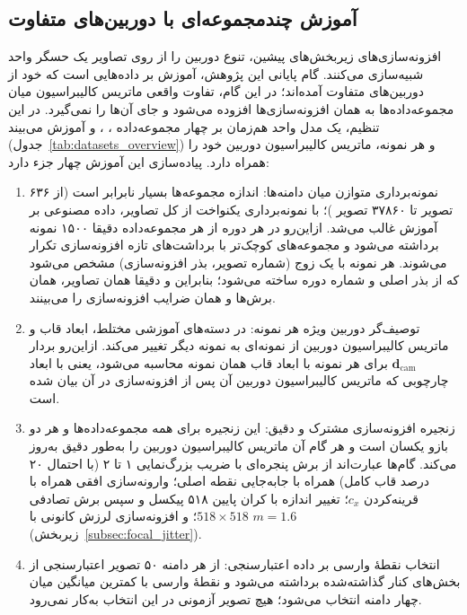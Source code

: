 \subsection[آموزش چندمجموعه‌ای با دوربین‌های متفاوت]{آموزش چندمجموعه‌ای با دوربین‌های متفاوت}
\label{subsec:multidomain_training}

افزونه‌سازی‌های زیربخش‌های پیشین، تنوع دوربین را از روی تصاویر یک حسگر واحد شبیه‌سازی می‌کنند. گام پایانی این پژوهش، آموزش \proposedmodel{} بر داده‌هایی است که خود از دوربین‌های متفاوت آمده‌اند؛ در این گام، تفاوت واقعی ماتریس کالیبراسیون میان مجموعه‌داده‌ها به همان افزونه‌سازی‌ها افزوده می‌شود و جای آن‌ها را نمی‌گیرد. در این تنظیم، یک مدل واحد هم‌زمان بر چهار مجموعه‌داده ، ،  و  آموزش می‌بیند (جدول~\ref{tab:datasets_overview}) و هر نمونه، ماتریس کالیبراسیون دوربین خود را همراه دارد. پیاده‌سازی این آموزش چهار جزء دارد:

\begin{enumerate}
 \item نمونه‌برداری متوازن میان دامنه‌ها: اندازه مجموعه‌ها بسیار نابرابر است (از ۶۳۶ تصویر  تا ۳۷۸۶۰ تصویر )؛ با نمونه‌برداری یکنواخت از کل تصاویر، داده مصنوعی بر آموزش غالب می‌شد. ازاین‌رو در هر دوره از هر مجموعه‌داده دقیقا ۱۵۰۰ نمونه برداشته می‌شود و مجموعه‌های کوچک‌تر با برداشت‌های تازه افزونه‌سازی تکرار می‌شوند. هر نمونه با یک زوج (شماره تصویر، بذر افزونه‌سازی) مشخص می‌شود که از بذر اصلی و شماره دوره ساخته می‌شود؛ بنابراین \proposedmodel{} و \controlmodel{} دقیقا همان تصاویر، همان برش‌ها و همان ضرایب افزونه‌سازی را می‌بینند.
 \item توصیف‌گر دوربین ویژه هر نمونه: در دسته‌های آموزشی مختلط، ابعاد قاب و ماتریس کالیبراسیون دوربین از نمونه‌ای به نمونه دیگر تغییر می‌کند. ازاین‌رو بردار $\mathbf{d}_{\mathrm{cam}}$ برای هر نمونه با ابعاد قاب همان نمونه محاسبه می‌شود، یعنی با ابعاد چارچوبی که ماتریس کالیبراسیون دوربین آن پس از افزونه‌سازی در آن بیان شده است.
 \item زنجیره افزونه‌سازی مشترک و دقیق: این زنجیره برای همه مجموعه‌داده‌ها و هر دو بازو یکسان است و هر گام آن ماتریس کالیبراسیون دوربین را به‌طور دقیق به‌روز می‌کند. گام‌ها عبارت‌اند از برش پنجره‌ای با ضریب بزرگ‌نمایی ۱ تا ۲ (با احتمال ۲۰ درصد قاب کامل) همراه با جابه‌جایی نقطه اصلی؛ وارونه‌سازی افقی همراه با قرینه‌کردن $c_x$؛ تغییر اندازه با کران پایین ۵۱۸ پیکسل و سپس برش تصادفی $518\times518$؛ و افزونه‌سازی لرزش کانونی با $m=1.6$ (زیربخش~\ref{subsec:focal_jitter}).
 \item انتخاب نقطهٔ وارسی بر داده اعتبارسنجی: از هر دامنه ۵۰ تصویر اعتبارسنجی از بخش‌های کنار گذاشته‌شده برداشته می‌شود و نقطهٔ وارسی با کمترین میانگین  میان چهار دامنه انتخاب می‌شود؛ هیچ تصویر آزمونی در این انتخاب به‌کار نمی‌رود.
\end{enumerate}

